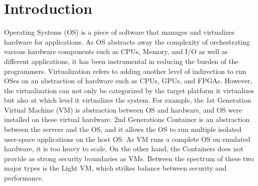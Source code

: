 \section{Introduction}
\label{sec:intro}
%
Operating Systems (OS) is a piece of software that manages and virtualizes hardware for applications.
%
As OS abstracts away the complexity of orchestrating various hardware components such as CPUs, Memory, and I/O as well as different applications, it has been instrumental in reducing the burden of the programmers.
%
Virtualization refers to adding another level of indirection to run OSes on an abstraction of hardware such as CPUs, GPUs, and FPGAs.
%
However, the virtualization can not only be categorized by the target platform it virtualizes but also at which level it virtualizes the system.
%
For example, the 1st Generation Virtual Machine (VM) is abstraction between OS and hardware, and OS were installed on these virtual hardware.
%
2nd Generations Container is an abstraction between the servers and the OS, and it allows the OS to run multiple isolated user-space applications on the host OS.
%
As VM runs a complete OS on emulated hardware, it is too heavy to scale.
%
On the other hand, the Containers does not provide as strong security boundaries as VMs.
%
Between the spectrum of these two major types is the Light VM, which strikes balance between security and performance.